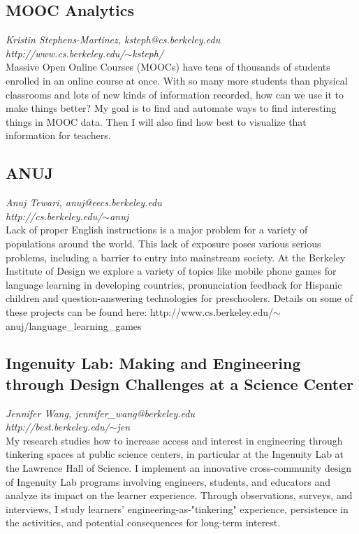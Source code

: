 \documentclass[foldmark,10pt,a4paper,notumble]{leaflet}
\begin{document}
\subsection{MOOC Analytics}
\emph{Kristin Stephens-Martinez, ksteph@cs.berkeley.edu}\\
\emph{http://www.cs.berkeley.edu/$\sim$ksteph/}\\
Massive Open Online Courses (MOOCs) have tens of thousands of students enrolled in an online course at once. With so many more students than physical classrooms and lots of new kinds of information recorded, how can we use it to make things better? My goal is to find and automate ways to find interesting things in MOOC data. Then I will also find how best to visualize that information for teachers.

\subsection{ANUJ}
\emph{Anuj Tewari, anuj@eecs.berkeley.edu}\\
\emph{http://cs.berkeley.edu/$\sim$anuj}\\
Lack of proper English instructions is a major problem for a variety of populations around the world. This lack of exposure poses various serious problems, including a barrier to entry into mainstream society. At the Berkeley Institute of Design we explore a variety of topics like mobile phone games for language learning in developing countries, pronunciation feedback for Hispanic children and question-answering technologies for preschoolers. Details on some of these projects can be found here: http://www.cs.berkeley.edu/$\sim$anuj/language\_learning\_games

\subsection{Ingenuity Lab: Making and Engineering through Design Challenges at a Science Center}
\emph{Jennifer Wang, jennifer\_wang@berkeley.edu}\\
\emph{http://best.berkeley.edu/$\sim$jen}\\
My research studies how to increase access and interest in engineering through tinkering spaces at public science centers, in particular at the Ingenuity Lab at the Lawrence Hall of Science. I implement an innovative cross-community design of Ingenuity Lab programs involving engineers, students, and educators and analyze its impact on the learner experience. Through observations, surveys, and interviews, I study learners' engineering-as-"tinkering" experience, persistence in the activities, and potential consequences for long-term interest.
\end{document}
